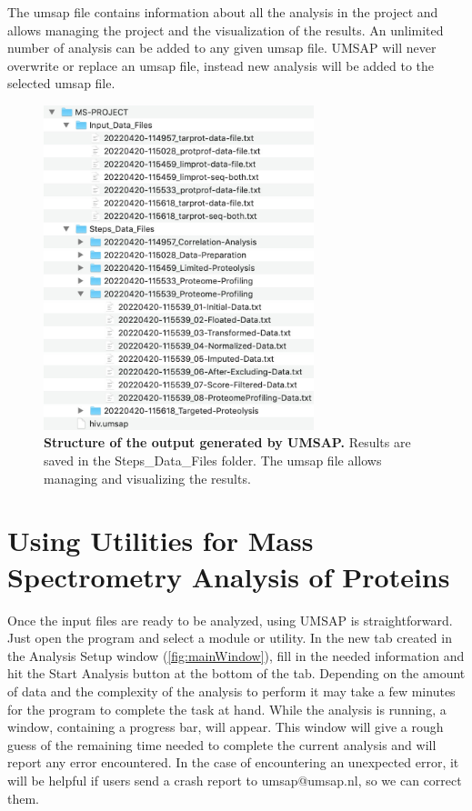 The umsap file contains information about all the analysis in the project and allows
managing the project and the visualization of the results. An unlimited number of
analysis can be added to any given umsap file. UMSAP will never overwrite or replace
an umsap file, instead new analysis will be added to the selected umsap file.

\begin{figure}[h]
    \centering
    \includegraphics[width=0.7\textwidth]{./IMAGES/OUTPUT/folder.jpg}
    \caption[Structure of the output generated by UMSAP]{\textbf{Structure of the
output generated by UMSAP.} Results are saved in the Steps{\_}Data{\_}Files folder. The
umsap file allows managing and visualizing the results.} 
    \label{fig:outFolder}
    \vspace{-5pt}
\end{figure}

\section{Using Utilities for Mass Spectrometry Analysis of Proteins}

Once the input files are ready to be analyzed, using UMSAP is straightforward. Just
open the program and select a module or utility. In the new tab created in the Analysis
Setup window (\autoref{fig:mainWindow}), fill in the needed
information and hit the Start Analysis button at the bottom of the tab. Depending on
the amount of data and the complexity of the analysis to perform it may take a few
minutes for the program to complete the task at hand. While the analysis is running, a
window, containing a progress bar, will appear. This window will give a rough guess
of the remaining time needed to complete the current analysis and will report any error
encountered. In the case of encountering an unexpected error, it will be helpful if
users send a crash report to umsap@umsap.nl, so we can correct them. 

